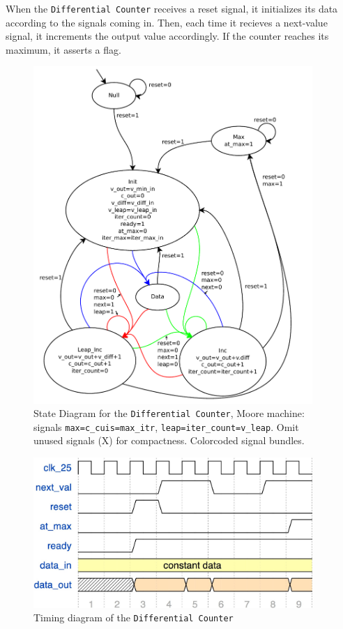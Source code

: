\documentclass{article}
\begin{document}
When the \texttt{Differential Counter} receives a reset signal, it initializes its data according to the signals coming in.
Then, each time it recieves a next-value signal, it increments the output value accordingly. If the counter reaches
its maximum, it asserts a flag.

\begin{figure}
  \centering
    \includegraphics[width=300pt]{state_diagrams/diff_counter.pdf}
  \caption{State Diagram for the \texttt{Differential Counter}, Moore machine: signals
    \texttt{max=c\_cuis=max\_itr}, \texttt{leap=iter\_count=v\_leap}. Omit
    unused signals (X) for compactness. Colorcoded signal bundles.}
\end{figure}

\begin{figure}
  \centering
    \includegraphics[width=300pt]{timing_diagrams/diff_counter.pdf}
  \caption{Timing diagram of the \texttt{Differential Counter}}
\end{figure}
\end{document}
